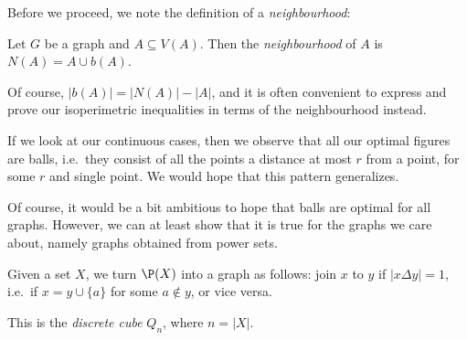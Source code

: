 \documentclass[a4paper]{article}
\begin{document}
Before we proceed, we note the definition of a \emph{neighbourhood}:
\begin{defi}[Neighbourhood]
  Let $G$ be a graph and $A \subseteq V(A)$. Then the \emph{neighbourhood} of $A$ is $N(A) = A \cup b(A)$.
\end{defi}
Of course, $|b(A)| = |N(A)| - |A|$, and it is often convenient to express and prove our isoperimetric inequalities in terms of the neighbourhood instead.

If we look at our continuous cases, then we observe that all our optimal figures are balls, i.e.\ they consist of all the points a distance at most $r$ from a point, for some $r$ and single point. We would hope that this pattern generalizes.

Of course, it would be a bit ambitious to hope that balls are optimal for all graphs. However, we can at least show that it is true for the graphs we care about, namely graphs obtained from power sets.

\begin{defi}
  Given a set $X$, we turn $\P(X)$ into a graph as follows: join $x$ to $y$ if $|x \Delta y| = 1$, i.e.\ if $x = y \cup \{a\}$ for some $a \not \in y$, or vice versa.

  This is the \emph{discrete cube} $Q_n$, where $n = |X|$.
\end{defi}
\end{document}
